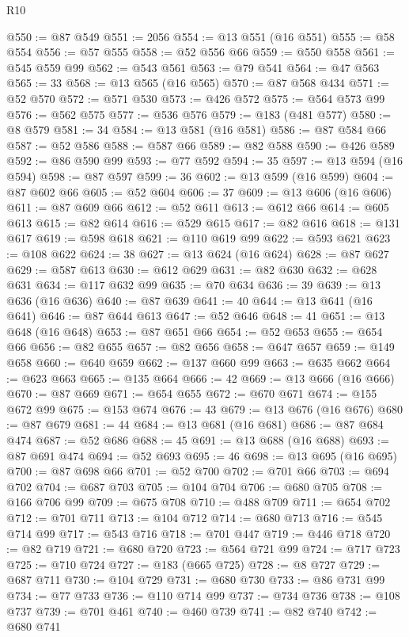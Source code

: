 \begin{lexlean}{R10}
\begin{coremodule}
@550 := @87 @549
@551 := 2056
@554 := @13 @551 (@16 @551)
@555 := @58 @554
@556 := @57 @555
@558 := @52 @556 @66
@559 := @550 @558
@561 := @545 @559 @99
@562 := @543 @561
@563 := @79 @541
@564 := @47 @563
@565 := 33
@568 := @13 @565 (@16 @565)
@570 := @87 @568 @434
@571 := @52 @570
@572 := @571 @530
@573 := @426 @572
@575 := @564 @573 @99
@576 := @562 @575
@577 := @536 @576
@579 := @183 (@481 @577)
@580 := @8 @579
@581 := 34
@584 := @13 @581 (@16 @581)
@586 := @87 @584 @66
@587 := @52 @586
@588 := @587 @66
@589 := @82 @588
@590 := @426 @589
@592 := @86 @590 @99
@593 := @77 @592
@594 := 35
@597 := @13 @594 (@16 @594)
@598 := @87 @597
@599 := 36
@602 := @13 @599 (@16 @599)
@604 := @87 @602 @66
@605 := @52 @604
@606 := 37
@609 := @13 @606 (@16 @606)
@611 := @87 @609 @66
@612 := @52 @611
@613 := @612 @66
@614 := @605 @613
@615 := @82 @614
@616 := @529 @615
@617 := @82 @616
@618 := @131 @617
@619 := @598 @618
@621 := @110 @619 @99
@622 := @593 @621
@623 := @108 @622
@624 := 38
@627 := @13 @624 (@16 @624)
@628 := @87 @627
@629 := @587 @613
@630 := @612 @629
@631 := @82 @630
@632 := @628 @631
@634 := @117 @632 @99
@635 := @70 @634
@636 := 39
@639 := @13 @636 (@16 @636)
@640 := @87 @639
@641 := 40
@644 := @13 @641 (@16 @641)
@646 := @87 @644 @613
@647 := @52 @646
@648 := 41
@651 := @13 @648 (@16 @648)
@653 := @87 @651 @66
@654 := @52 @653
@655 := @654 @66
@656 := @82 @655
@657 := @82 @656
@658 := @647 @657
@659 := @149 @658
@660 := @640 @659
@662 := @137 @660 @99
@663 := @635 @662
@664 := @623 @663
@665 := @135 @664
@666 := 42
@669 := @13 @666 (@16 @666)
@670 := @87 @669
@671 := @654 @655
@672 := @670 @671
@674 := @155 @672 @99
@675 := @153 @674
@676 := 43
@679 := @13 @676 (@16 @676)
@680 := @87 @679
@681 := 44
@684 := @13 @681 (@16 @681)
@686 := @87 @684 @474
@687 := @52 @686
@688 := 45
@691 := @13 @688 (@16 @688)
@693 := @87 @691 @474
@694 := @52 @693
@695 := 46
@698 := @13 @695 (@16 @695)
@700 := @87 @698 @66
@701 := @52 @700
@702 := @701 @66
@703 := @694 @702
@704 := @687 @703
@705 := @104 @704
@706 := @680 @705
@708 := @166 @706 @99
@709 := @675 @708
@710 := @488 @709
@711 := @654 @702
@712 := @701 @711
@713 := @104 @712
@714 := @680 @713
@716 := @545 @714 @99
@717 := @543 @716
@718 := @701 @447
@719 := @446 @718
@720 := @82 @719
@721 := @680 @720
@723 := @564 @721 @99
@724 := @717 @723
@725 := @710 @724
@727 := @183 (@665 @725)
@728 := @8 @727
@729 := @687 @711
@730 := @104 @729
@731 := @680 @730
@733 := @86 @731 @99
@734 := @77 @733
@736 := @110 @714 @99
@737 := @734 @736
@738 := @108 @737
@739 := @701 @461
@740 := @460 @739
@741 := @82 @740
@742 := @680 @741

\end{coremodule}
\end{lexlean}
